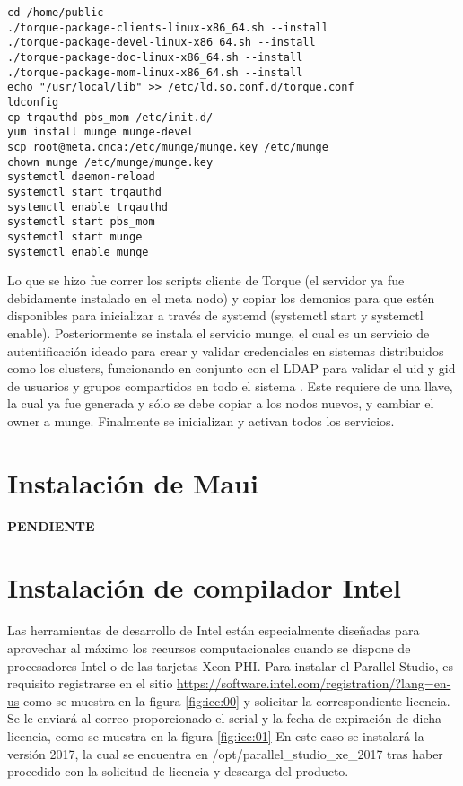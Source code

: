\begin{lstlisting} 
cd /home/public
./torque-package-clients-linux-x86_64.sh --install
./torque-package-devel-linux-x86_64.sh --install
./torque-package-doc-linux-x86_64.sh --install
./torque-package-mom-linux-x86_64.sh --install
echo "/usr/local/lib" >> /etc/ld.so.conf.d/torque.conf
ldconfig
cp trqauthd pbs_mom /etc/init.d/
yum install munge munge-devel
scp root@meta.cnca:/etc/munge/munge.key /etc/munge
chown munge /etc/munge/munge.key
systemctl daemon-reload
systemctl start trqauthd
systemctl enable trqauthd
systemctl start pbs_mom
systemctl start munge
systemctl enable munge
\end{lstlisting}

Lo que se hizo fue correr los scripts cliente de Torque (el servidor ya fue debidamente instalado en el meta nodo) y copiar los demonios para que estén disponibles para inicializar a través de systemd (systemctl start y systemctl enable). Posteriormente se instala el servicio munge, el cual es un servicio de autentificación ideado para crear y validar credenciales  en sistemas distribuidos como los clusters, funcionando en conjunto con el LDAP para validar el uid y gid de usuarios y grupos compartidos en todo el sistema \cite{munge}. Este requiere de una llave, la cual ya fue generada y sólo se debe copiar a los nodos nuevos, y cambiar el owner a munge. Finalmente se inicializan y activan todos los servicios.

\section{Instalación de Maui}
\textbf{\huge{PENDIENTE}}
\cite{maui}

\section{Instalación de compilador Intel}
Las herramientas de desarrollo de Intel están especialmente diseñadas para aprovechar al máximo los recursos computacionales cuando se dispone de procesadores Intel o de las tarjetas Xeon PHI. Para instalar el Parallel Studio, es requisito registrarse en el sitio \url{https://software.intel.com/registration/?lang=en-us} como se muestra en la figura \ref{fig:icc:00} y solicitar la correspondiente licencia. Se le enviará al correo proporcionado el serial y la fecha de expiración de dicha licencia, como se muestra en la figura \ref{fig:icc:01} En este caso se instalará la versión 2017, la cual se encuentra en /opt/parallel\_studio\_xe\_2017 tras haber procedido con la solicitud de licencia y descarga del producto.


